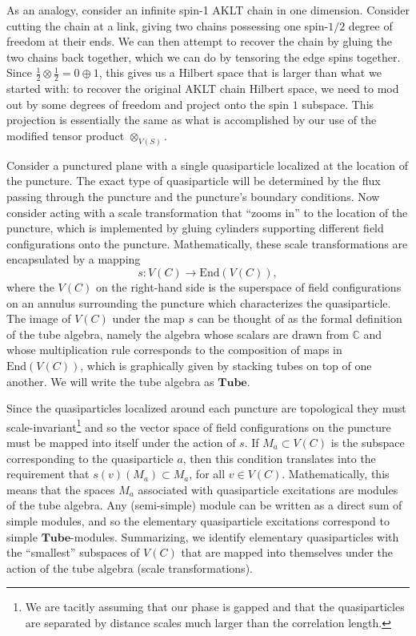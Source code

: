 \documentclass[12pt,a4paper]{article}
\newcounter{arrow}
\newcommand{\tp}{\otimes}
\newcommand{\ra}{\rightarrow}
\newcommand{\cc}{\mathbb{C}}
\newcommand\be            {\begin{equation}}
\newcommand\ee            {\end{equation}}
\newcommand{\End}{\text{End}}
\newcommand{\fube}{\textbf{Tube}}
\newcommand{\tube}{\textbf{Tube}}
\begin{document}
As an analogy, consider an infinite spin-1 AKLT chain in one dimension. Consider cutting the chain at a link, giving two chains possessing one spin-$1/2$ degree of freedom at their ends. We can then attempt to recover the chain by gluing the two chains back together, which we can do by tensoring the edge spins together. Since $\frac{1}{2}\tp \frac{1}{2} = 0\oplus 1$, this gives us a Hilbert space that is larger than what we started with: to recover the original AKLT chain Hilbert space, we need to mod out by some degrees of freedom and project onto the spin $1$ subspace. This projection is essentially the same as what is accomplished by our use of the modified tensor product $\tp_{V(S)}$. 


Consider a punctured plane with a single quasiparticle localized at the location of the puncture. The exact type of quasiparticle will be determined by the flux passing through the puncture and the puncture's boundary conditions. Now consider acting with a scale transformation that ``zooms in'' to the location of the puncture, which is implemented by gluing cylinders supporting different field configurations onto the puncture. Mathematically, these scale transformations are encapsulated by a mapping 
\be s : V(C) \ra \End(V(C)),\ee
where the $V(C)$ on the right-hand side is the superspace of field configurations on an annulus surrounding the puncture which characterizes the quasiparticle. The image of $V(C)$ under the map $s$ can be thought of as the formal definition of the tube algebra, namely the algebra whose scalars are drawn from $\cc$ and whose multiplication rule corresponds to the composition of maps in $\End(V(C))$, which is graphically given by stacking tubes on top of one another. We will write the tube algebra as $\fube$.	

Since the quasiparticles localized around each puncture are topological they must scale-invariant\footnote{We are tacitly assuming that our phase is gapped and that the quasiparticles are separated by distance scales much larger than the correlation length.} and so the vector space of field configurations on the puncture must be mapped into itself under the action of $s$. If $M_a \subset V(C)$ is the subspace corresponding to the quasiparticle $a$, then this condition translates into the requirement that $s(v) (M_a) \subset M_a$, for all $v \in V(C)$. 
Mathematically, this means that the spaces $M_a$ associated with quasiparticle excitations are modules of the tube algebra. Any (semi-simple) module can be written as a direct sum of simple modules, and so the elementary quasiparticle excitations correspond to simple $\tube$-modules. Summarizing, we identify elementary quasiparticles with the ``smallest'' subspaces of $V(C)$ that are mapped into themselves under the action of the tube algebra (scale transformations). 
\end{document}
